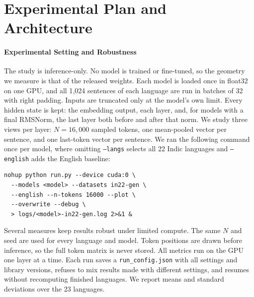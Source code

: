 \section{Experimental Plan and Architecture}
\label{sec:app1_experimental_plan}

\paragraph{Experimental Setting and Robustness}
The study is inference-only. No model is trained or fine-tuned, so the geometry we measure is that of the released weights. Each model is loaded once in float32 on one GPU, and all 1{,}024 sentences of each language are run in batches of 32 with right padding. Inputs are truncated only at the model's own limit. Every hidden state is kept: the embedding output, each layer, and, for models with a final RMSNorm, the last layer both before and after that norm. We study three views per layer: $N = 16{,}000$ sampled tokens, one mean-pooled vector per sentence, and one last-token vector per sentence. We ran the following command once per model, where omitting \texttt{--langs} selects all 22 Indic languages and \texttt{--english} adds the English baseline:

\noindent
\begin{small}
\begin{verbatim}
nohup python run.py --device cuda:0 \
  --models <model> --datasets in22-gen \
  --english --n-tokens 16000 --plot \
  --overwrite --debug \
  > logs/<model>-in22-gen.log 2>&1 &
\end{verbatim}
\end{small}
Several measures keep results robust under limited compute. The same $N$ and seed are used for every language and model. Token positions are drawn before inference, so the full token matrix is never stored. All metrics run on the GPU one layer at a time. Each run saves a \texttt{run\_config.json} with all settings and library versions, refuses to mix results made with different settings, and resumes without recomputing finished languages. We report means and standard deviations over the 23 languages.

